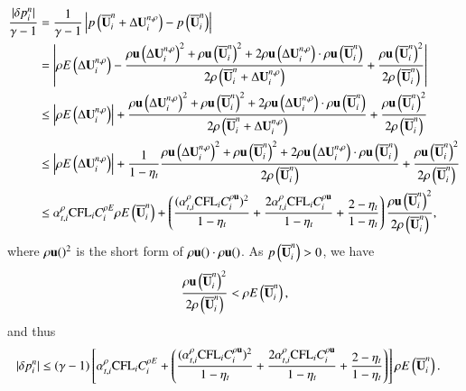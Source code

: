 \begin{equation}
    \begin{aligned}
        \dfrac{|\delta p_i^n|}{\gamma-1} 
        &=  \dfrac{1}{\gamma-1} \left| p \left(\overline{\mathbf{U}}^n_i + \mathrm\Delta\mathbf{U}_i^{n,\rho}\right) -  p \left(\overline{\mathbf{U}}^n_i\right) \right| \\
        &=  \left| \rho E\left( \mathrm\Delta\mathbf{U}_i^{n,\rho} \right) 
         - \frac{
         \rho\mathbf{u}\left(\mathrm\Delta\mathbf{U}_i^{n,\rho}\right)^2
         +
         \rho\mathbf{u}\left(\overline{\mathbf{U}}^n_i\right)^2
         +
         2\rho\mathbf{u}\left(\mathrm\Delta\mathbf{U}_i^{n,\rho}\right)\cdot\rho\mathbf{u}\left(\overline{\mathbf{U}}^n_i\right)
         }{
         2\rho\left(\overline{\mathbf{U}}^n_i+\mathrm\Delta\mathbf{U}_i^{n,\rho}  \right)
         }
         + \frac{ \rho\mathbf{u}\left(\overline{\mathbf{U}}^n_i\right)^2}{2\rho\left(\overline{\mathbf{U}}^n_i\right)}
        \right| \\
        &\leq  \left| \rho E\left( \mathrm\Delta\mathbf{U}_i^{n,\rho} \right) \right|
         +
         \dfrac{
         \rho\mathbf{u}\left(\mathrm\Delta\mathbf{U}_i^{n,\rho}\right)^2
         +
         \rho\mathbf{u}\left(\overline{\mathbf{U}}^n_i\right)^2
         +
         2\rho\mathbf{u}\left(\mathrm\Delta\mathbf{U}_i^{n,\rho}\right)\cdot\rho\mathbf{u}\left(\overline{\mathbf{U}}^n_i\right)
         }{
         2\rho\left(\overline{\mathbf{U}}^n_i+\mathrm\Delta\mathbf{U}_i^{n,\rho}  \right)
         }
         +
          \frac{ \rho\mathbf{u}\left(\overline{\mathbf{U}}^n_i\right)^2}{2\rho\left(\overline{\mathbf{U}}^n_i\right)} \\
        &\leq  \left| \rho E\left( \mathrm\Delta\mathbf{U}_i^{n,\rho} \right) \right|
         +
         \frac{1}{1-\eta_t}
         \frac{
         \rho\mathbf{u}\left(\mathrm\Delta\mathbf{U}_i^{n,\rho}\right)^2
         +
         \rho\mathbf{u}\left(\overline{\mathbf{U}}^n_i\right)^2
         +
         2\rho\mathbf{u}\left(\mathrm\Delta\mathbf{U}_i^{n,\rho}\right)\cdot\rho\mathbf{u}\left(\overline{\mathbf{U}}^n_i\right)
         }{
         2\rho\left(\overline{\mathbf{U}}^n_i \right)
         }
         +
          \frac{ \rho\mathbf{u}\left(\overline{\mathbf{U}}^n_i\right)^2}{2\rho\left(\overline{\mathbf{U}}^n_i\right)} \\
        &\leq \alpha_{t,i}^\rho\text{CFL}_i C^{\rho E}_i  \rho E\left( \overline{\mathbf{U}}^n_i \right) 
        +\left(
        \frac{(\alpha_{t,i}^\rho\text{CFL}_i C^{\rho \mathbf{u}}_i)^2}{1-\eta_t}
        +\frac{2\alpha_{t,i}^\rho\text{CFL}_i C^{\rho \mathbf{u}}_i}{1-\eta_t}
        + \frac{2-\eta_t}{1-\eta_t}
        \right)
        \frac{ \rho\mathbf{u}\left(\overline{\mathbf{U}}^n_i\right)^2}{2\rho\left(\overline{\mathbf{U}}^n_i\right)},
    \end{aligned}
\end{equation}
where $\rho\mathbf{u}()^2$ is the short form of $\rho\mathbf{u}()\cdot\rho\mathbf{u}()$.
As $p\left(\overline{\mathbf{U}}^n_i\right) > 0$, we have
\begin{equation}
    \frac{ \rho\mathbf{u}\left(\overline{\mathbf{U}}^n_i\right)^2}{2\rho\left(\overline{\mathbf{U}}^n_i\right)} < \rho E\left(\overline{\mathbf{U}}^n_i\right),
\end{equation}
and thus
\begin{equation}
    \begin{aligned}
        |\delta p_i^n| &\leq
        (\gamma-1)\left[
         \alpha_{t,i}^\rho\text{CFL}_i C^{\rho E}_i  
        +\left(
        \frac{(\alpha_{t,i}^\rho\text{CFL}_i C^{\rho \mathbf{u}}_i)^2}{1-\eta_t}
        +\frac{2\alpha_{t,i}^\rho\text{CFL}_i C^{\rho \mathbf{u}}_i}{1-\eta_t}
        + \frac{2-\eta_t}{1-\eta_t}
        \right)
        \right]
        \rho E\left( \overline{\mathbf{U}}^n_i \right).
    \end{aligned}
\end{equation}
